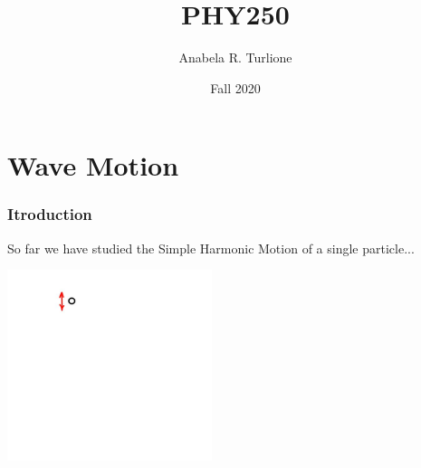 \documentclass[]{beamer}
\title{PHY250}    %
\author{Anabela R. Turlione}                 %
\institute{Digipen}      %
\date{Fall 2020}                    %
\begin{document}
\begin{frame}
  \titlepage
\end{frame}

\section[]{}

\begin{frame}
  \tableofcontents
\end{frame}

\section{Wave Motion}

\begin{frame}
\frametitle{Itroduction}

So far we have studied the Simple Harmonic Motion of a single particle...

\begin{center}
  \includegraphics[height=2.2in]{images4/0b.jpg}
\end{center}

  \end{frame}

\end{document}
